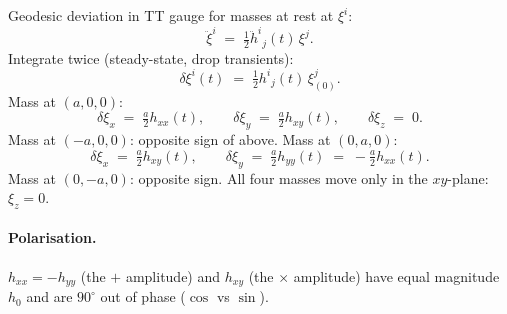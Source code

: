 \documentclass[11pt]{article}
\begin{document}
Geodesic deviation in TT gauge for masses at rest at $\xi^i$:
\[
\ddot\xi^i \;=\; \tfrac{1}{2}\ddot h^i{}_j(t)\,\xi^j.
\]
Integrate twice (steady-state, drop transients):
\[
\delta\xi^i(t) \;=\; \tfrac{1}{2}h^i{}_j(t)\,\xi^j_{(0)}.
\]
Mass at $(a,0,0)$:
\[
\delta\xi_x \;=\; \tfrac{a}{2}h_{xx}(t),\qquad \delta\xi_y \;=\; \tfrac{a}{2}h_{xy}(t),\qquad \delta\xi_z \;=\; 0.
\]
Mass at $(-a,0,0)$: opposite sign of above. Mass at $(0,a,0)$:
\[
\delta\xi_x \;=\; \tfrac{a}{2}h_{xy}(t),\qquad \delta\xi_y \;=\; \tfrac{a}{2}h_{yy}(t) \;=\; -\tfrac{a}{2}h_{xx}(t).
\]
Mass at $(0,-a,0)$: opposite sign. All four masses move only in the $xy$-plane: $\xi_z=0$.

\paragraph{Polarisation.}
$h_{xx}=-h_{yy}$ (the $+$ amplitude) and $h_{xy}$ (the $\times$ amplitude) have equal magnitude $h_0$ and are $90^\circ$ out of phase ($\cos$ vs $\sin$). 
\end{document}
